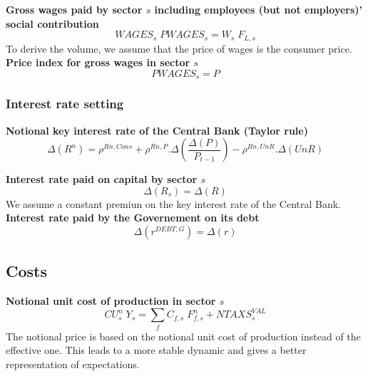 \documentclass[12pt]{article}
\numberwithin{equation}{section}
\begin{document}
\noindent \textbf{Gross wages paid by sector $s$ including employees (but not employers)' social contribution} 
\begin{dmath}
WAGES_{s} \; PWAGES_{s} = W_{s} \; F_{L, s}
\label{prices.mdlWAGES[s]}
\end{dmath}
To derive the volume, we assume that the price of wages is the consumer price. \\

\noindent \textbf{Price index for gross wages in sector $s$} 
\begin{dmath}
PWAGES_{s} = P
\label{prices.mdlPWAGES[s]}
\end{dmath}



\subsubsection{Interest rate setting}



\noindent \textbf{Notional key interest rate of the Central Bank (Taylor rule)} 
\begin{dmath}
\varDelta \left(R^{n}\right) = \rho^{Rn,Cons} + \rho^{Rn,P} . \varDelta \left(\frac{\varDelta \left(P\right)}{P_{t-1}}\right) - \rho^{Rn,UnR} . \varDelta \left(UnR\right)
\label{prices.mdlR_n}
\end{dmath}

\noindent \textbf{Interest rate paid on capital by sector $s$} 
\begin{dmath}
\varDelta \left(R_{s}\right) = \varDelta \left(R\right)
\label{prices.mdlR[s]}
\end{dmath}
We assume a constant premiun on the key interest rate of the Central Bank. \\

\noindent \textbf{Interest rate paid by the Governement on its debt} 
\begin{dmath}
\varDelta \left(r^{DEBT,G}\right) = \varDelta \left(r\right)
\label{prices.mdlr_DEBT_G}
\end{dmath}



\subsection{Costs}



\noindent \textbf{Notional unit cost of production in sector $s$} 
\begin{dmath}
CU^{n}_{s} \; Y_{s} = \sum_{f} C_{f, s} \; F^{n}_{f, s} + NTAXS^{VAL}_{s}
\label{prices.mdlCU_n[s]}
\end{dmath}
The notional price is based on the notional unit cost of production instead of the effective one. This leads to a more stable dynamic and gives a better representation of expectations. \\
\end{document}
